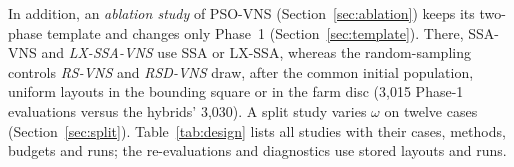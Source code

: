 In addition, an \emph{ablation study} of PSO-VNS (Section~\ref{sec:ablation}) keeps its two-phase template and changes only Phase~1 (Section~\ref{sec:template}). There, SSA-VNS and \emph{LX-SSA-VNS} use SSA or LX-SSA, whereas the random-sampling controls \emph{RS-VNS} and \emph{RSD-VNS} draw, after the common initial population, uniform layouts in the bounding square or in the farm disc (3,015 Phase-1 evaluations versus the hybrids' 3,030). A split study varies $\omega$ on twelve cases (Section~\ref{sec:split}). Table~\ref{tab:design} lists all studies with their cases, methods, budgets and runs; the re-evaluations and diagnostics use stored layouts and runs.

